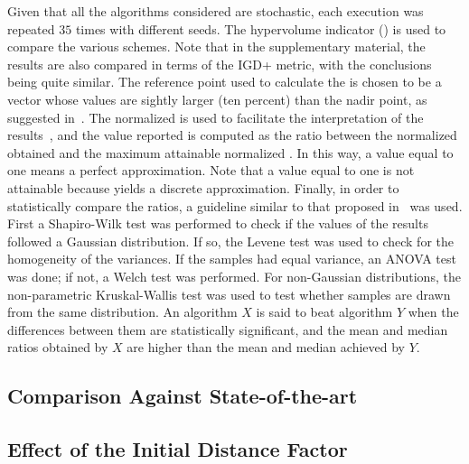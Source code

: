 Given that all the algorithms considered are stochastic, each execution was repeated $35$ times with different seeds.
%
The hypervolume indicator (\HV{}) is used to compare the various schemes.
%
Note that in the supplementary material, the results are also compared in terms of the IGD+ metric, with the conclusions being quite similar.
%
The reference point used to calculate the \HV{} is chosen to be a vector whose values are sightly larger (ten percent) than the nadir point,
as suggested in~\cite{ishibuchi2017reference}.
%
The normalized \HV{} is used to facilitate the interpretation of the results~\cite{li2015evolutionary},
and the value reported is computed as the ratio between the normalized \HV{} obtained and the maximum attainable
normalized \HV{}.
%
In this way, a value equal to one means a perfect approximation.
%
Note that a value equal to one is not attainable because \MOEAS{} yields a discrete approximation.
%
Finally, in order to statistically compare the \HV{} ratios, a guideline similar to that proposed in~\cite{Joel:StatisticalTest} was used.
%
First a Shapiro-Wilk test was performed to check if the values of the results followed a Gaussian distribution.
%
If so, the Levene test was used to check for the homogeneity of the variances.
%
If the samples had equal variance, an ANOVA test was done; if not, a Welch test was performed.
%
For non-Gaussian distributions, the non-parametric Kruskal-Wallis test was used to test whether samples are drawn from the same distribution.
%
An algorithm $X$ is said to beat algorithm $Y$ when the differences between them are statistically significant, and the mean and median \HV{} ratios
obtained by $X$ are higher than the mean and median achieved by $Y$.



\subsection{Comparison Against State-of-the-art}
\subsection{Effect of the Initial Distance Factor}
